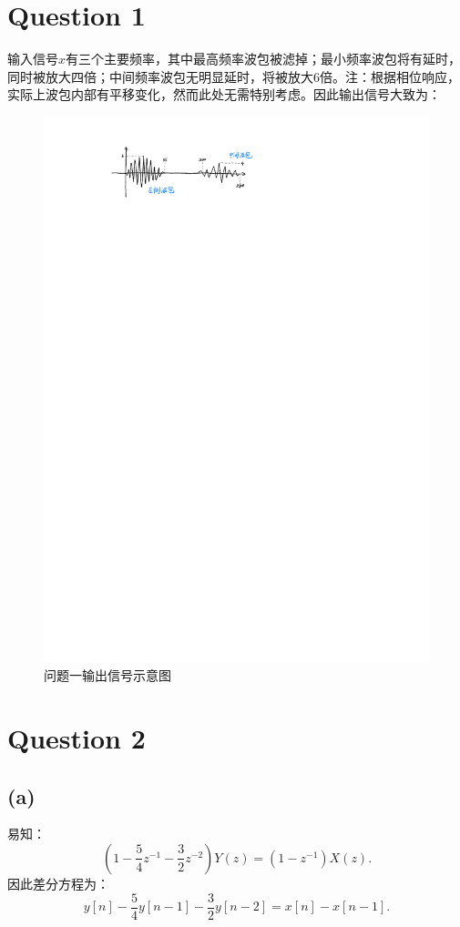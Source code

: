 \documentclass{article}
\begin{document}
\section*{Question 1}
输入信号$x$有三个主要频率，其中最高频率波包被滤掉；最小频率波包将有延时，同时被放大四倍；中间频率波包无明显延时，将被放大6倍。注：根据相位响应，实际上波包内部有平移变化，然而此处无需特别考虑。因此输出信号大致为：
\begin{figure}[htpb]
	\centering
	\includegraphics[width=0.8\linewidth]{1.pdf}
	\caption{问题一输出信号示意图}
\end{figure}

\section*{Question 2}
\subsection*{(a)}
易知：
\[
	(1-\frac{5}{4}z^{-1}-\frac{3}{2}z^{-2})Y(z)=(1-z^{-1})X(z)
.\] 
因此差分方程为：
\[
	y[n]-\frac{5}{4}y[n-1]-\frac{3}{2}y[n-2]=x[n]-x[n-1]
.\] 
\end{document}
